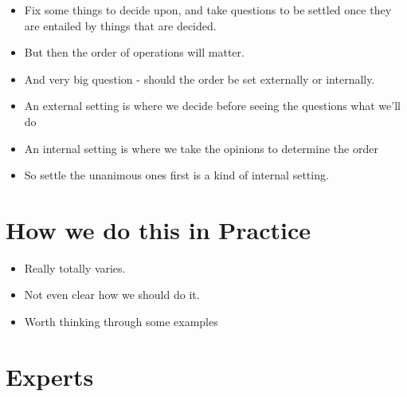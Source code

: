 \begin{itemize}
\item{} Fix some things to decide upon, and take questions to be settled once they are entailed by things that are decided.

\item{} But then the order of operations will matter.

\item{} And very big question - should the order be set externally or internally.

\item{} An external setting is where we decide before seeing the questions what we'll do

\item{} An internal setting is where we take the opinions to determine the order

\item{} So settle the unanimous ones first is a kind of internal setting.

\end{itemize}
\section{How we do this in Practice}
\label{howwedothisinpractice}

\begin{itemize}
\item{} Really totally varies.

\item{} Not even clear how we should do it.

\item{} Worth thinking through some examples

\end{itemize}
\section{Experts}
\label{experts}

